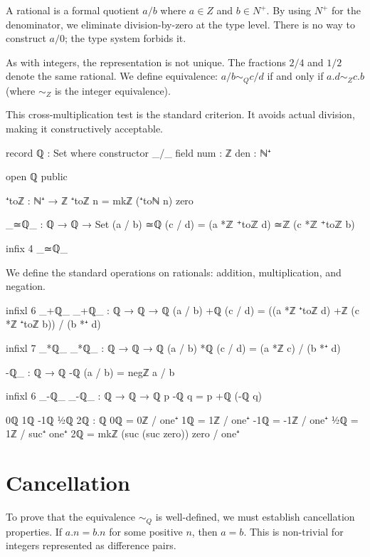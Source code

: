 \documentclass[11pt,a4paper]{book}
\def\cdot{.}%
\def\mathbb#1{#1}%
\begin{document}
A rational is a formal quotient $a/b$ where $a \in \mathbb{Z}$ and $b \in \mathbb{N}^+$. 
By using $\mathbb{N}^+$ for the denominator, we eliminate division-by-zero at the type level. 
There is no way to construct $a/0$; the type system forbids it.

As with integers, the representation is not unique. The fractions $2/4$ and $1/2$ 
denote the same rational. We define equivalence: $a/b \sim_{\mathbb{Q}} c/d$ if and only if 
$a \cdot d \sim_{\mathbb{Z}} c \cdot b$ (where $\sim_{\mathbb{Z}}$ is the integer equivalence).

This cross-multiplication test is the standard criterion. It avoids actual division, 
making it constructively acceptable.

\begin{code}
record ℚ : Set where
  constructor _/_
  field
    num : ℤ
    den : ℕ⁺

open ℚ public

⁺toℤ : ℕ⁺ → ℤ
⁺toℤ n = mkℤ (⁺toℕ n) zero

_≃ℚ_ : ℚ → ℚ → Set
(a / b) ≃ℚ (c / d) = (a *ℤ ⁺toℤ d) ≃ℤ (c *ℤ ⁺toℤ b)

infix 4 _≃ℚ_
\end{code}

We define the standard operations on rationals: addition, multiplication, and negation.

\begin{code}
infixl 6 _+ℚ_
_+ℚ_ : ℚ → ℚ → ℚ
(a / b) +ℚ (c / d) = ((a *ℤ ⁺toℤ d) +ℤ (c *ℤ ⁺toℤ b)) / (b *⁺ d)

infixl 7 _*ℚ_
_*ℚ_ : ℚ → ℚ → ℚ
(a / b) *ℚ (c / d) = (a *ℤ c) / (b *⁺ d)

-ℚ_ : ℚ → ℚ
-ℚ (a / b) = negℤ a / b

infixl 6 _-ℚ_
_-ℚ_ : ℚ → ℚ → ℚ
p -ℚ q = p +ℚ (-ℚ q)

0ℚ 1ℚ -1ℚ ½ℚ 2ℚ : ℚ
0ℚ  = 0ℤ / one⁺
1ℚ  = 1ℤ / one⁺
-1ℚ = -1ℤ / one⁺
½ℚ  = 1ℤ / suc⁺ one⁺
2ℚ  = mkℤ (suc (suc zero)) zero / one⁺
\end{code}

\section{Cancellation}

To prove that the equivalence $\sim_{\mathbb{Q}}$ is well-defined, we must establish 
cancellation properties. If $a \cdot n = b \cdot n$ for some positive $n$, then $a = b$. 
This is non-trivial for integers represented as difference pairs.
\end{document}
